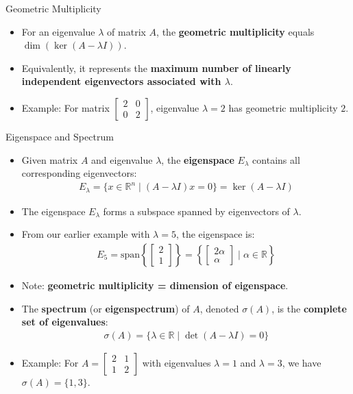 \begin{frame}{Geometric Multiplicity}
\begin{itemize}
    \item For an eigenvalue $\lambda$ of matrix $A$, the \textbf{geometric multiplicity} equals $\dim(\ker(A-\lambda I))$.
    \item Equivalently, it represents the \textbf{maximum number of linearly independent eigenvectors associated with $\lambda$}.
    \item Example: For matrix $\begin{bmatrix} 2 & 0 \\ 0 & 2 \end{bmatrix}$, eigenvalue $\lambda = 2$ has geometric multiplicity $2$.
\end{itemize}
\end{frame}
\begin{frame}{Eigenspace and Spectrum}
\begin{itemize}
    \item Given matrix $A$ and eigenvalue $\lambda$, the \textbf{eigenspace} $E_\lambda$ contains all corresponding eigenvectors:
    \begin{align}
        E_\lambda = \{ x \in \mathbb{R}^n \mid (A-\lambda I)x = 0 \} = \ker(A-\lambda I)
    \end{align}
    \item The eigenspace $E_\lambda$ forms a subspace spanned by eigenvectors of $\lambda$.
    \item From our earlier example with $\lambda=5$, the eigenspace is:
    \begin{align}
        E_5 = \text{span}\left\{ \begin{bmatrix} 2\\1 \end{bmatrix}\right\} = \left\{ \begin{bmatrix} 2\alpha\\ \alpha \end{bmatrix} \mid \alpha \in \mathbb{R} \right\}
    \end{align}
\end{itemize}
\end{frame}
\begin{frame}{}
\begin{itemize}
    \item Note: \textbf{geometric multiplicity = dimension of eigenspace}.
    \item The \textbf{spectrum} (or \textbf{eigenspectrum}) of $A$, denoted $\sigma(A)$, is the \textbf{complete set of eigenvalues}:
    \begin{align}
        \sigma(A) = \{ \lambda \in \mathbb{R} \mid \det(A-\lambda I) = 0 \}
    \end{align}
    \item Example: For $A = \begin{bmatrix} 2 & 1 \\ 1 & 2 \end{bmatrix}$ with eigenvalues $\lambda = 1$ and $\lambda = 3$, we have $\sigma(A) = \{1, 3\}$.
\end{itemize}
\end{frame}
